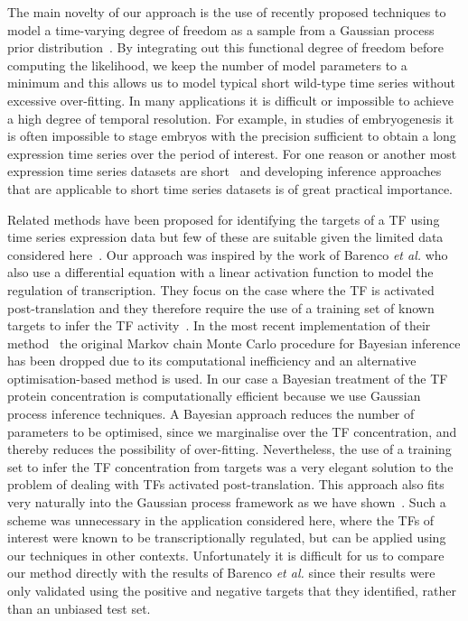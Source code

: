 \documentclass{pnastwo}
\begin{document}
\begin{article}
The main novelty of our approach is the use of recently proposed
techniques to model a time-varying degree of freedom as a sample from
a Gaussian process prior distribution~\cite{Gao2008}. By integrating out this functional
degree of freedom before computing the likelihood, we keep the
number of model parameters to a minimum and this allows us to model
typical short wild-type time series without excessive over-fitting. In
many applications it is difficult or impossible to achieve a high
degree of temporal resolution. For example, in studies of
embryogenesis it is often impossible to stage embryos with the
precision sufficient to obtain a long expression time series over the
period of interest. For one reason or another most expression time
series datasets are short~\cite{Ernst2005} and developing inference approaches
that are applicable to short time series datasets is of great
practical importance.  

Related methods have been proposed for identifying the
targets of a TF using time series expression data but few of these are suitable given the
limited data considered here~\cite{Bansal2007a}. Our approach was inspired by the work of Barenco {\em et
al.} who also use a differential equation with a linear activation
function to model the regulation of transcription. They focus on the
case where the TF is activated post-translation and they therefore
require the use of a training set of
known targets to infer the TF activity~\cite{Barenco2006a}. In the most recent
implementation of their method~\cite{Barenco2009} the original Markov
chain Monte Carlo procedure for Bayesian inference has been dropped due to its computational
inefficiency and an alternative optimisation-based method is used. In our case a Bayesian treatment of the TF protein
concentration is computationally efficient because we use Gaussian
process inference techniques. A Bayesian approach reduces the number of parameters
to be optimised, since we marginalise over the TF concentration, and
thereby reduces the possibility of over-fitting. Nevertheless, the use of a training set to infer the
TF concentration from targets was a very elegant solution to the
problem of dealing with TFs activated post-translation. This
approach also fits very naturally into the Gaussian process
framework as we have shown~\cite{Gao2008}. Such a scheme was unnecessary in the application considered
here, where the TFs of interest were known to be transcriptionally
regulated, but can be applied using our techniques in other
contexts. Unfortunately it is difficult for us to compare our method
directly with the results of Barenco {\em et al.} since their results
were only validated using the positive and negative targets that they identified,
rather than an unbiased test set. 


\end{article}
\end{document}
